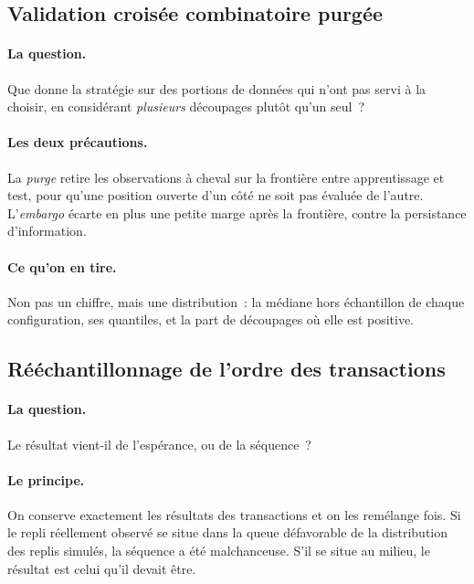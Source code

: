 \subsection{Validation croisée combinatoire purgée}

\paragraph{La question.} Que donne la stratégie sur des portions de données
qui n'ont pas servi à la choisir, en considérant \emph{plusieurs} découpages
plutôt qu'un seul~?

\paragraph{Les deux précautions.} La \emph{purge} retire les observations à
cheval sur la frontière entre apprentissage et test, pour qu'une position
ouverte d'un côté ne soit pas évaluée de l'autre. L'\emph{embargo} écarte en
plus une petite marge après la frontière, contre la persistance
d'information.

\paragraph{Ce qu'on en tire.} Non pas un chiffre, mais une distribution~: la
médiane hors échantillon de chaque configuration, ses quantiles, et la part
de découpages où elle est positive.

\subsection{Rééchantillonnage de l'ordre des transactions}

\paragraph{La question.} Le résultat vient-il de l'espérance, ou de la
séquence~?

\paragraph{Le principe.} On conserve exactement les résultats des
\XTenMCTrades{} transactions et on les remélange \XTenMCSims{} fois. Si le
repli réellement observé se situe dans la queue défavorable de la
distribution des replis simulés, la séquence a été malchanceuse. S'il se
situe au milieu, le résultat est celui qu'il devait être.

